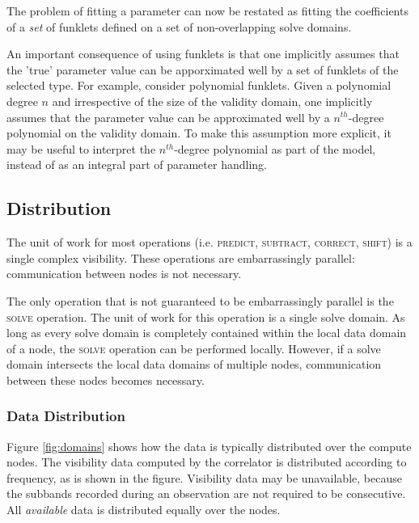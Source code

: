 \documentclass[10pt]{lofar}
\newcommand{\predict}{\textsc{predict}\xspace}
\newcommand{\subtract}{\textsc{subtract}\xspace}
\newcommand{\correct}{\textsc{correct}\xspace}
\newcommand{\solve}{\textsc{solve}\xspace}
\newcommand{\shift}{\textsc{shift}\xspace}
\begin{document}
The problem of fitting a parameter can now be restated as fitting the
coefficients of a \emph{set} of funklets defined on a set of non-overlapping
solve domains.

An important consequence of using funklets is that one implicitly assumes that
the 'true' parameter value can be apporximated well by a set of funklets of the
selected type. For example, consider polynomial funklets. Given a polynomial
degree $n$ and irrespective of the size of the validity domain, one implicitly
assumes that the parameter value can be approximated well by a $n^{th}$-degree
polynomial on the validity domain. To make this assumption more explicit, it may
be useful to interpret the $n^{th}$-degree polynomial as part of the model,
instead of as an integral part of parameter handling.

\subsection{Distribution}
\label{subsec:distribution}

The unit of work for most operations (i.e. \predict, \subtract, \correct,
\shift) is a single complex visibility. These operations are embarrassingly
parallel: communication between nodes is not necessary.

The only operation that is not guaranteed to be embarrassingly parallel is the
\solve operation. The unit of work for this operation is a single solve domain.
As long as every solve domain is completely contained within the local data
domain of a node, the \solve operation can be performed locally. However, if a
solve domain intersects the local data domains of multiple nodes, communication
between these nodes becomes necessary.

\subsubsection{Data Distribution}
\label{subsubsec:distribution-data}
Figure \ref{fig:domains} shows how the data is typically distributed over the
compute nodes. The visibility data computed by the correlator is distributed
according to frequency, as is shown in the figure. Visibility data may be
unavailable, because the subbands recorded during an observation are not
required to be consecutive. All \emph{available} data is distributed equally
over the nodes. 
\end{document}
